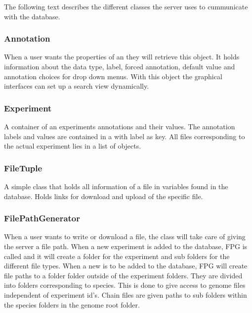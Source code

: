 The following text describes the different classes the server uses to cummunicate with the database.

\subsubsection{Annotation}
When a user wants the properties of an  they will retrieve this object. It holds information about the data type, label, forced annotation, default value and annotation choices for drop down menus. With this object the graphical interfaces can set up a search view dynamically.

\subsubsection{Experiment}
A container of an experiments annotations and their values. The annotation labels and values are contained in a  with label as key. All files corresponding to the actual experiment lies in a list of  objects.

\subsubsection{FileTuple}
A simple class that holds all information of a file in variables found in the database. Holds links for download and upload of the specific file.

\subsubsection{FilePathGenerator}
When a user wants to write or download a file, the  class will take care of giving the server a file path. When a new experiment is added to the database, FPG is called and it will create a folder for the experiment and sub folders for the different file types. When a new  is to be added to the database, FPG will create file paths to a folder folder outside of the experiment folders. They are divided into folders corresponding to species.  This is done to give access to genome files independent of experiment id's. Chain files are given paths to sub folders within the species folders in the genome root folder.

